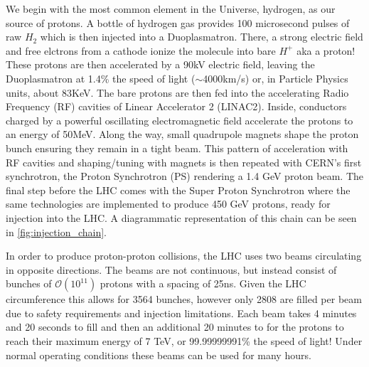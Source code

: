 We begin with the most common element in the Universe, hydrogen, as our source
of protons.  A bottle of hydrogen gas provides 100 microsecond pulses of raw
$H_{2}$ which is then injected into a Duoplasmatron. There,  a strong electric
field and free elctrons from a cathode ionize the molecule into bare $H^{+}$
aka a proton!  These protons are then accelerated by a 90kV electric field,
leaving the Duoplasmatron at 1.4\% the speed of light ($\sim$4000km/s) or, in
Particle Physics units, about 83KeV. The bare protons are then fed into the
accelerating Radio Frequency (RF) cavities of Linear Accelerator 2 (LINAC2).
Inside, conductors charged by a powerful oscillating electromagnetic field
accelerate the protons to an energy of 50MeV. Along the way, small
quadrupole magnets shape the proton bunch ensuring they remain in a tight
beam.  This pattern of acceleration with RF cavities and shaping/tuning with
magnets is then repeated with CERN's first synchrotron, the Proton Synchrotron
(PS) rendering a 1.4 GeV proton beam.  The final step before the LHC comes with the
Super Proton Synchrotron where the same technologies are implemented to produce
450 GeV protons, ready for injection into the LHC. A diagrammatic representation
of this chain can be seen in \cref{fig:injection_chain}. 

In order to produce proton-proton collisions, the LHC uses two beams
circulating in opposite directions.  The beams are not continuous, but instead
consist of bunches of $\mathcal{O}(10^{11})$ protons with a spacing of 25ns.
Given the LHC circumference this allows for 3564 bunches, however only 2808 are
filled per beam due to safety requirements and injection limitations.  Each
beam takes 4 minutes and 20 seconds to fill and then an additional 20 minutes
to for the protons to reach their maximum energy of 7 TeV, or 99.99999991\%
the speed of light! Under normal operating conditions these beams can be used
for many hours.
